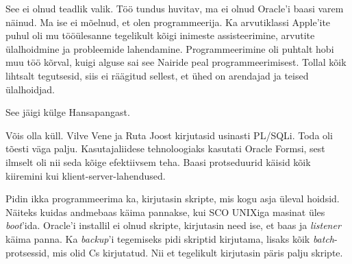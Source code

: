 
See ei olnud teadlik valik. Töö tundus huvitav, 
ma ei olnud Oracle'i baasi varem näinud. Ma ise ei mõelnud, et olen 
programmeerija. Ka arvutiklassi Apple'ite puhul oli mu tööülesanne 
tegelikult kõigi inimeste assisteerimine, arvutite ülalhoidmine ja
probleemide lahendamine. Programmeerimine oli 
puhtalt hobi muu töö kõrval, kuigi alguse sai see Nairide peal
programmeerimisest. Tollal kõik lihtsalt tegutsesid, siis ei räägitud sellest, et ühed on arendajad ja teised ülalhoidjad.


See jäigi külge Hansapangast. 


Võis olla küll. Vilve Vene ja Ruta 
Joost kirjutasid usinasti PL/SQLi. Toda oli tõesti väga palju. Kasutajaliidese 
tehnoloogiaks kasutati Oracle Formsi, 
sest ilmselt oli nii seda kõige efektiivsem teha. Baasi protseduurid käisid kõik kiiremini kui 
klient-server-lahendused.


Pidin ikka programmeerima ka, kirjutasin skripte, 
mis kogu asja üleval hoidsid. Näiteks kuidas andmebaas käima pannakse, kui SCO 
UNIXiga masinat üles \emph{boot}'ida. Oracle'i installil ei olnud skripte, kirjutasin need ise, et baas ja \emph{listener} käima panna. Ka 
\emph{backup}'i tegemiseks pidi skriptid kirjutama, lisaks kõik 
\emph{batch}-protsessid, mis olid Cs kirjutatud. 
Nii et tegelikult kirjutasin päris palju skripte.


